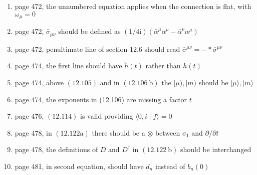 \documentclass{article}
\begin{document}
\begin{enumerate}
\item page 472, the unnumbered equation applies when the connection is flat, with $\omega_{\mu}=0$

\item page 472, $\bar{\sigma}_{\mu \nu}$ should be defined as $(1 / 4 \mathrm{i})\left(\bar{\alpha}^{\mu} \alpha^{\nu}-\bar{\alpha}^{\nu} \alpha^{\mu}\right)$

\item page 472, penultimate line of section $12.6$ should read $\bar{\sigma}^{\mu \nu}=-* \bar{\sigma}^{\mu \nu}$

\item page 474, the first line should have $\tilde{h}(t)$ rather than $h(t)$

\item page 474, above $(12.105)$ and in $(12.106 \mathrm{~b})$ the $\mid \mu), \mid m)$ should be $|\mu\rangle,|m\rangle$

\item page 474, the exponents in (12.106) are missing a factor $t$

\item page 476, $(12.114)$ is valid providing $\langle 0, i \mid f\rangle=0$

\item page 478, in $(12.122 \mathrm{a})$ there should be a $\otimes$ between $\sigma_{1}$ and $\partial / \partial t$

\item page 478, the definitions of $D$ and $D^{\dagger}$ in $(12.122 \mathrm{~b})$ should be interchanged

\item page 481, in second equation, should have $d_{n}$ instead of $b_{n}(0)$ 
\end{enumerate}
\end{document}
